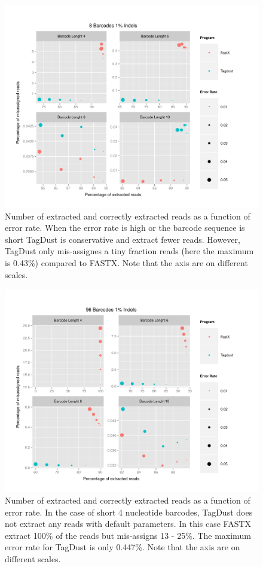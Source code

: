 \documentclass[11pt,a4paper,oneside]{book}
\begin{document}
\begin{figure}[H]
\includegraphics[scale = 0.65]{figures/8Barcodes1Indels.pdf}
\caption{Number of extracted and correctly extracted reads as a function of error rate. When the error rate is high or the barcode sequence is short TagDust is conservative and extract fewer reads. However, TagDust only mis-assignes a tiny fraction reads (here the maximum is 0.43\%)  compared to FASTX. Note that the axis are on different scales.}
\end{figure}
\begin{figure}
\includegraphics[scale = 0.65]{figures/96Barcodes1Indels.pdf}
\caption{Number of extracted and correctly extracted reads as a function of error rate. In the case of short 4 nucleotide barcodes, TagDust does not extract any reads with default parameters. In this case FASTX extract 100\% of the reads but mis-assigns 13 - 25\%. The maximum error rate for TagDust is only 0.447\%. Note that the axis are on different scales.}
\end{figure}
\end{document}
